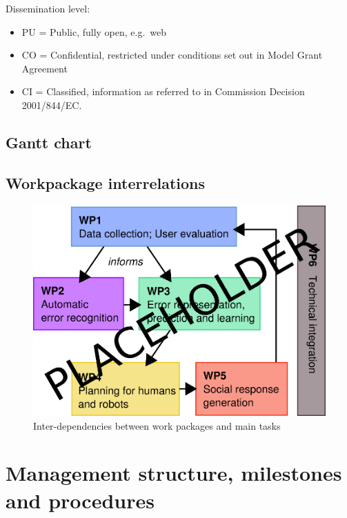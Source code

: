 \documentclass[11pt]{report}
\begin{document}
Dissemination level:

\begin{itemize}

\item   PU = Public, fully open, e.g.~web
\item   CO = Confidential, restricted under conditions set out in Model Grant
  Agreement
\item   CI = Classified, information as referred to in Commission Decision
  2001/844/EC.
\end{itemize}

\subsection{Gantt chart}\label{gantt-chart}

\begin{landscape}

\end{landscape}

\subsection{Workpackage interrelations}\label{workpackage-interrelations}

\begin{figure}[!htbp]
    \centering
    \includegraphics[width=0.8\linewidth]{figs/wp-interrelations}
    \caption{Inter-dependencies between work packages and main tasks}
    \label{}
\end{figure}



\section{Management structure, milestones and procedures}\label{management-structure-milestones-and-procedures}
\end{document}
